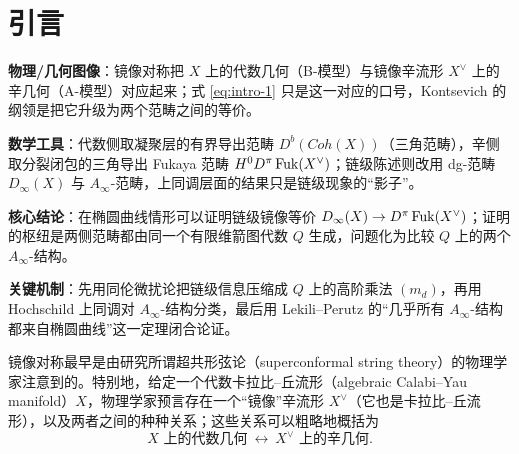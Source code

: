 
\section{引言}\label{sec:intro}

\begin{keytakeaways}
  \item \textbf{物理/几何图像}：镜像对称把 $X$ 上的代数几何（B-模型）与镜像辛流形 $X^\vee$ 上的辛几何（A-模型）对应起来；式 \eqref{eq:intro-1} 只是这一对应的口号，Kontsevich 的纲领是把它升级为两个范畴之间的等价。
  \item \textbf{数学工具}：代数侧取凝聚层的有界导出范畴 $D^b(Coh(X))$（三角范畴），辛侧取分裂闭包的三角导出 Fukaya 范畴 $H^0D^\pi\operatorname{Fuk}(X^\vee)$；链级陈述则改用 dg-范畴 $D_\infty(X)$ 与 $A_\infty$-范畴，上同调层面的结果只是链级现象的“影子”。
  \item \textbf{核心结论}：在椭圆曲线情形可以证明链级镜像等价 $D_\infty(X)\to D^\pi\operatorname{Fuk}(X^\vee)$；证明的枢纽是两侧范畴都由同一个有限维箭图代数 $Q$ 生成，问题化为比较 $Q$ 上的两个 $A_\infty$-结构。
  \item \textbf{关键机制}：先用同伦微扰论把链级信息压缩成 $Q$ 上的高阶乘法 $(m_d)$，再用 Hochschild 上同调对 $A_\infty$-结构分类，最后用 Lekili–Perutz 的“几乎所有 $A_\infty$-结构都来自椭圆曲线”这一定理闭合论证。
\end{keytakeaways}

镜像对称最早是由研究所谓超共形弦论（superconformal string theory）的物理学家注意到的。特别地，给定一个代数卡拉比–丘流形（algebraic Calabi–Yau manifold）$X$，物理学家预言存在一个“镜像”辛流形 $X^\vee$（它也是卡拉比–丘流形），以及两者之间的种种关系；这些关系可以粗略地概括为
\begin{equation}\label{eq:intro-1}
  \text{$X$ 上的代数几何}\ \longleftrightarrow\ \text{$X^\vee$ 上的辛几何}.
\end{equation}


